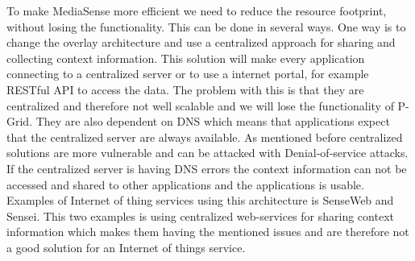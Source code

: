 To make MediaSense more efficient we need to reduce the resource footprint, without losing  the functionality. This can be done in several ways. One way is to change the overlay architecture and use a centralized approach for sharing and collecting context information. This solution will make every application connecting to a centralized server or to use a internet portal, for example RESTful API to access the data. The problem with this is that they are centralized and therefore not well scalable and we will lose the functionality of P-Grid. They are also dependent on DNS which means that applications expect that the centralized server are always available. As mentioned before centralized solutions are more vulnerable and can be attacked with Denial-of-service attacks. If the centralized server is having DNS errors the context information can not be accessed and shared to other applications and the applications is usable. Examples of Internet of thing services using this architecture is SenseWeb and Sensei. This two examples is using centralized web-services for sharing context information which makes them having the mentioned issues and are therefore not a good solution for an Internet of things service.